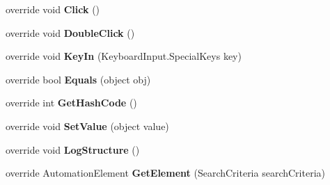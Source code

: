 \begin{DoxyCompactItemize}
\item 
\hypertarget{class_proto_test_1_1_golem_1_1_white_1_1_elements_1_1_white_window_a37b9fc2e2dc5486bc7b0166b2662788b}{override void {\bfseries Click} ()}\label{class_proto_test_1_1_golem_1_1_white_1_1_elements_1_1_white_window_a37b9fc2e2dc5486bc7b0166b2662788b}

\item 
\hypertarget{class_proto_test_1_1_golem_1_1_white_1_1_elements_1_1_white_window_ae9eea760fa5dee5f561164891a7f0430}{override void {\bfseries Double\-Click} ()}\label{class_proto_test_1_1_golem_1_1_white_1_1_elements_1_1_white_window_ae9eea760fa5dee5f561164891a7f0430}

\item 
\hypertarget{class_proto_test_1_1_golem_1_1_white_1_1_elements_1_1_white_window_a9e8161546d65b44ac2ed345fb57778bf}{override void {\bfseries Key\-In} (Keyboard\-Input.\-Special\-Keys key)}\label{class_proto_test_1_1_golem_1_1_white_1_1_elements_1_1_white_window_a9e8161546d65b44ac2ed345fb57778bf}

\item 
\hypertarget{class_proto_test_1_1_golem_1_1_white_1_1_elements_1_1_white_window_a7addf304a0a684b20f6f33d17fde2537}{override bool {\bfseries Equals} (object obj)}\label{class_proto_test_1_1_golem_1_1_white_1_1_elements_1_1_white_window_a7addf304a0a684b20f6f33d17fde2537}

\item 
\hypertarget{class_proto_test_1_1_golem_1_1_white_1_1_elements_1_1_white_window_a206655db8ee7a262092d06e68ba1aeb6}{override int {\bfseries Get\-Hash\-Code} ()}\label{class_proto_test_1_1_golem_1_1_white_1_1_elements_1_1_white_window_a206655db8ee7a262092d06e68ba1aeb6}

\item 
\hypertarget{class_proto_test_1_1_golem_1_1_white_1_1_elements_1_1_white_window_a806f4e44e46f55d62bf659d29dd813f5}{override void {\bfseries Set\-Value} (object value)}\label{class_proto_test_1_1_golem_1_1_white_1_1_elements_1_1_white_window_a806f4e44e46f55d62bf659d29dd813f5}

\item 
\hypertarget{class_proto_test_1_1_golem_1_1_white_1_1_elements_1_1_white_window_a2c426974cc3c5d8f37c43a20901d98b0}{override void {\bfseries Log\-Structure} ()}\label{class_proto_test_1_1_golem_1_1_white_1_1_elements_1_1_white_window_a2c426974cc3c5d8f37c43a20901d98b0}

\item 
\hypertarget{class_proto_test_1_1_golem_1_1_white_1_1_elements_1_1_white_window_a03ed9d2c6dd696d162ff2cedffc08349}{override Automation\-Element {\bfseries Get\-Element} (Search\-Criteria search\-Criteria)}\label{class_proto_test_1_1_golem_1_1_white_1_1_elements_1_1_white_window_a03ed9d2c6dd696d162ff2cedffc08349}


\end{DoxyCompactItemize}

